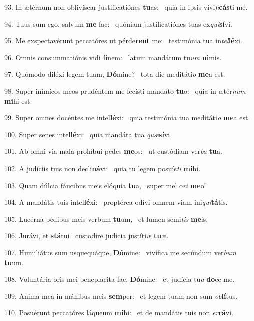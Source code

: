 93. In ætérnum non oblivíscar justificatiónes \textbf{tu}as: \ast\  quia in ipsis vivi\textit{fi}\textbf{cás}ti me.\

94. Tuus sum ego, salvum \textbf{me} fac: \ast\  quóniam justificatiónes tuas ex\textit{qui}\textbf{sí}vi.\

95. Me exspectavérunt peccatóres ut pérde\textbf{rent} me: \ast\  testimónia tua in\textit{tel}\textbf{lé}xi.\

96. Omnis consummatiónis vidi \textbf{fi}nem: \ast\  latum mandátum tu\textit{um} \textbf{ni}mis.\

97. Quómodo diléxi legem tuam, \textbf{Dó}mine? \ast\  tota die meditáti\textit{o} \textbf{me}a est.\

98. Super inimícos meos prudéntem me fecísti mandáto \textbf{tu}o: \ast\  quia in ætér\textit{num} \textbf{mi}hi est.\

99. Super omnes docéntes me intel\textbf{lé}xi: \ast\  quia testimónia tua meditáti\textit{o} \textbf{me}a est.\

100. Super senes intel\textbf{lé}xi: \ast\  quia mandáta tua \textit{quæ}\textbf{sí}vi.\

101. Ab omni via mala prohíbui pedes \textbf{me}os: \ast\  ut custódiam ver\textit{ba} \textbf{tu}a.\

102. A judíciis tuis non decli\textbf{ná}vi: \ast\  quia tu legem posuís\textit{ti} \textbf{mi}hi.\

103. Quam dúlcia fáucibus meis elóquia \textbf{tu}a, \ast\  super mel o\textit{ri} \textbf{me}o!\

104. A mandátis tuis intel\textbf{lé}xi: \ast\  proptérea odívi omnem viam ini\textit{qui}\textbf{tá}tis.\

105. Lucérna pédibus meis verbum \textbf{tu}um, \ast\  et lumen sémi\textit{tis} \textbf{me}is.\

106. Jurávi, et \textbf{stá}tui \ast\  custodíre judícia justíti\textit{æ} \textbf{tu}æ.\

107. Humiliátus sum usquequáque, \textbf{Dó}mine: \ast\  vivífica me secúndum ver\textit{bum} \textbf{tu}um.\

108. Voluntária oris mei beneplácita fac, \textbf{Dó}mine: \ast\  et judícia tu\textit{a} \textbf{do}ce me.\

109. Anima mea in mánibus meis \textbf{sem}per: \ast\  et legem tuam non sum \textit{ob}\textbf{lí}tus.\

110. Posuérunt peccatóres láqueum \textbf{mi}hi: \ast\  et de mandátis tuis non \textit{er}\textbf{rá}vi.\

